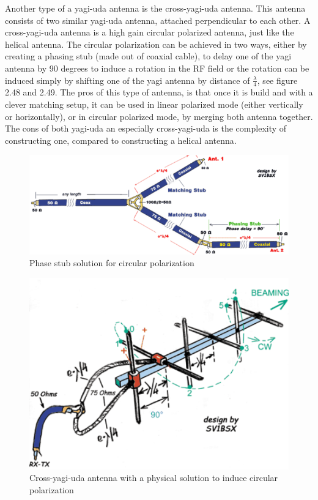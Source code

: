 Another type of a yagi-uda antenna is the cross-yagi-uda antenna. This antenna consists of two similar yagi-uda antenna, attached perpendicular to each other. A cross-yagi-uda antenna is a high gain circular polarized antenna, just like the helical antenna. The circular polarization can be achieved in two ways, either by creating a phasing stub (made out of coaxial cable), to delay one of the yagi antenna by 90 degrees to induce a rotation in the RF field or the rotation can be induced simply by shifting one of the yagi antenna by distance of $\frac{\lambda}{4}$, see figure 2.48 and 2.49. The pros of this type of antenna, is that once it is build and with a clever matching setup, it can be used in linear polarized mode (either vertically or horizontally), or in circular polarized mode, by merging both antenna together. The cons of both yagi-uda an especially cross-yagi-uda is the complexity of constructing one, compared to constructing a helical antenna. 

\begin{figure}[h]
\centering
\includegraphics[scale=0.8]{figures/PhaseStub.PNG}
\caption{Phase stub solution for circular polarization\cite{YagiMatching}}
\end{figure}

\begin{figure}[h]
\centering
\includegraphics[scale=0.8]{figures/CrossYagi.PNG}
\caption{Cross-yagi-uda antenna with a physical solution to induce circular polarization\cite{YagiMatching}}
\end{figure}

